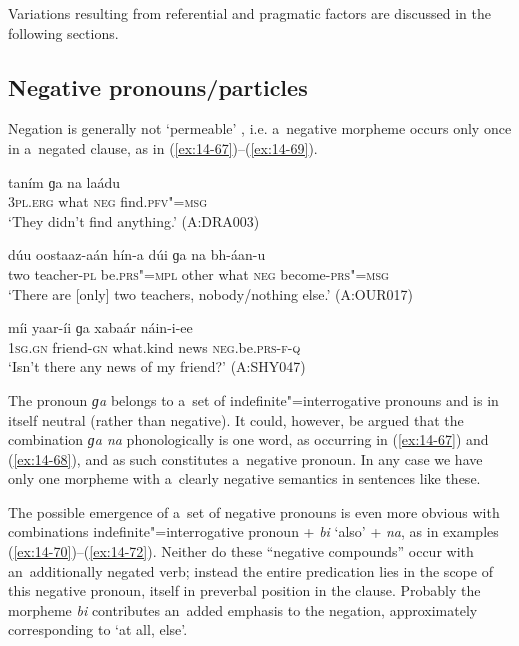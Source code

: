 Variations resulting from referential and pragmatic factors are discussed in the following sections.


\subsection{Negative pronouns/particles}
\label{subsec:14-3-2}

Negation is generally not `permeable' \citep[563]{ramat2006}, i.e. a~negative morpheme occurs only once in a~negated clause, as in (\ref{ex:14-67})--(\ref{ex:14-69}).

\begin{exe}
\ex
\label{ex:14-67}
\gll taním ɡa na laádu \\
\textsc{3pl.erg} what \textsc{neg} find.\textsc{pfv"=msg}  \\
\glt `They didn't find anything.' (A:DRA003)

\ex
\label{ex:14-68}
\gll dúu oostaaz-aán hín-a dúi ɡa na  bh-áan-u \\
two teacher-\textsc{pl} be.\textsc{prs"=mpl} other what \textsc{neg}  become-\textsc{prs"=msg} \\
\glt `There are [only] two teachers, nobody/nothing else.' (A:OUR017)

\ex
\label{ex:14-69}
\gll míi yaar-íi ɡa xabaár náin-i-ee \\
\textsc{1sg.gn} friend-\textsc{gn} what.kind news \textsc{neg}.be.\textsc{prs-f-q}  \\
\glt `Isn't there any news of my friend?' (A:SHY047)
\end{exe}

The pronoun \textit{ɡa} belongs to a~set of indefinite"=interrogative pronouns and is in itself neutral (rather than negative). It could, however, be argued that the combination \textit{ɡa na} phonologically is one word, as occurring in (\ref{ex:14-67}) and (\ref{ex:14-68}), and as such constitutes a~negative pronoun. In any case we have only one morpheme with a~clearly negative semantics in sentences like these. 



The possible emergence of a~set of negative pronouns is even more obvious with combinations indefinite"=interrogative pronoun + \textit{bi} `also' + \textit{na}, as in examples (\ref{ex:14-70})--(\ref{ex:14-72}). Neither do these ``negative compounds'' occur with an~additionally negated verb; instead the entire predication lies in the scope of this negative pronoun, itself in preverbal position in the clause. Probably the morpheme \textit{bi} contributes an~added emphasis to the negation, approximately corresponding to `at all, else'.

